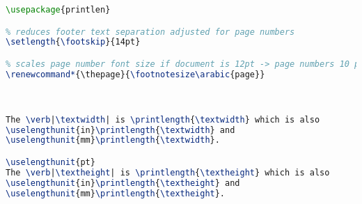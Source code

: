 \begin{tcolorbox}[breakable, size=fbox, boxrule=1pt, pad at break*=1mm,colback=cellbackground, colframe=cellborder]
\begin{lstlisting}[language=TeX,frame=single,framerule=0pt,label=lst:scr1543X0]
% print LaTeX dimensions
\usepackage{printlen}

% reduces footer text separation adjusted for page numbers
\setlength{\footskip}{14pt}

% scales page number font size if document is 12pt -> page numbers 10 pt
\renewcommand*{\thepage}{\footnotesize\arabic{page}}



The \verb|\textwidth| is \printlength{\textwidth} which is also
\uselengthunit{in}\printlength{\textwidth} and
\uselengthunit{mm}\printlength{\textwidth}.

\uselengthunit{pt}
The \verb|\textheight| is \printlength{\textheight} which is also
\uselengthunit{in}\printlength{\textheight} and
\uselengthunit{mm}\printlength{\textheight}.


\end{lstlisting}
\end{tcolorbox}
\lstset{style=resetdefaults}




%